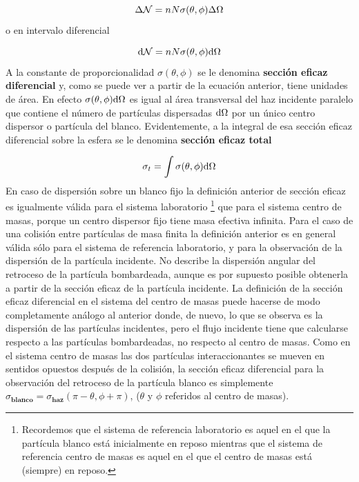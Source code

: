 \begin{equation}
	\Delta \mathcal{N} = n N \sigma (\theta,\phi) \Delta \Omega
\end{equation}
o en intervalo diferencial

\begin{equation}
	\mathrm{d} \mathcal{N} = n N \sigma (\theta,\phi) \mathrm{d} \Omega
\end{equation}
A la constante de proporcionalidad $\sigma(\theta,\phi)$ se le denomina \textbf{sección eficaz diferencial} y, como se puede ver a partir de la ecuación anterior, tiene unidades de área. En efecto $\sigma (\theta,\phi)\mathrm{d} \Omega$ es igual al área transversal del haz incidente paralelo que contiene el número de partículas dispersadas $\mathrm{d} \Omega$ por un único centro dispersor  o partícula del blanco. Evidentemente, a la integral de esa sección eficaz diferencial sobre la esfera se le denomina \textbf{sección eficaz total}

\begin{equation}
	\sigma_t = \int \sigma (\theta,\phi) \mathrm{d} \Omega
\end{equation}
En caso de dispersión sobre un blanco fijo la definición anterior de sección eficaz es igualmente válida para el sistema laboratorio \footnote{Recordemos que el sistema de referencia laboratorio es aquel en el que la partícula blanco está inicialmente en reposo mientras que el sistema de referencia centro de masas es aquel en el que el centro de masas está (siempre) en reposo.} que para el sistema centro de masas, porque un centro dispersor fijo tiene masa efectiva infinita. Para el caso de una colisión entre partículas de masa finita la definición anterior es en general válida sólo para el sistema de referencia laboratorio, y para la observación de la dispersión de la partícula incidente. No describe la dispersión angular del retroceso de la partícula bombardeada, aunque es por supuesto posible obtenerla a partir de la sección eficaz de la partícula incidente. La definición de la sección eficaz diferencial en el sistema del centro de masas puede hacerse de modo completamente análogo al anterior donde, de nuevo, lo que se observa es la dispersión de las partículas incidentes, pero el flujo incidente tiene que calcularse respecto a las partículas bombardeadas, no respecto al centro de masas. Como en el sistema centro de masas las dos partículas interaccionantes se mueven en sentidos opuestos después de la colisión, la sección eficaz diferencial para la observación del retroceso de la partícula blanco es simplemente $\sigma_{\textbf{blanco}} = \sigma_{\textbf{haz}} (\pi - \theta, \phi+\pi)$, ($\theta$ y $\phi$ referidos al centro de masas).


